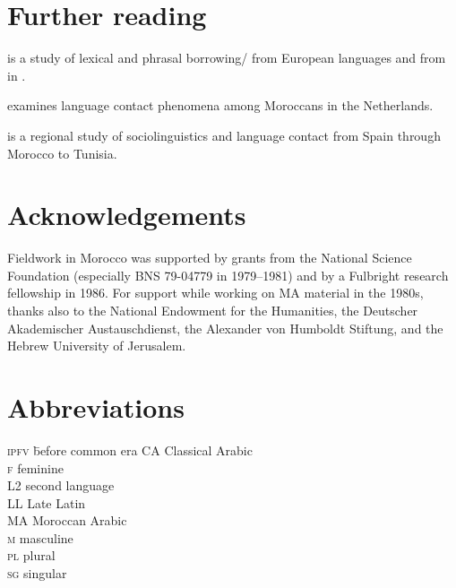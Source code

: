 \documentclass[output=paper]{langsci/langscibook}
\begin{document}
\section*{Further reading}
\begin{furtherreading}
\item \citet{Heath1989} is a study of lexical and phrasal borrowing/ from European languages and from   in .
\item \citet{Nortier1990} examines language contact phenomena among Moroccans in the Netherlands.
\item \citet{Sayahi2014} is a regional study of  sociolinguistics and language contact from Spain through Morocco to Tunisia.
\end{furtherreading}

\section*{Acknowledgements}

Fieldwork in Morocco was supported by grants from the National Science Foundation (especially BNS 79-04779 in 1979--1981) and by a Fulbright research fellowship in 1986. For support while working on MA material in the 1980s, thanks also to the National Endowment for the Humanities, the Deutscher Akademischer Austauschdienst, the Alexander von Humboldt Stiftung, and the {Hebrew} University of {Jerusalem}.


\section*{Abbreviations}
\begin{multicols}{2}
\begin{tabbing}
\textsc{ipfv} \hspace{1em} \= before common era\kill
CA         \> Classical Arabic\\
\textsc{f}  \> feminine\\
L2          \> second language \\
{LL}          \> Late Latin\\
MA         \> Moroccan Arabic\\
\textsc{m}  \> masculine\\
\textsc{pl} \> plural\\
\textsc{sg} \> singular
\end{tabbing}
\end{multicols}


{\sloppy\printbibliography[heading=subbibliography,notkeyword=this]}
\end{document}
